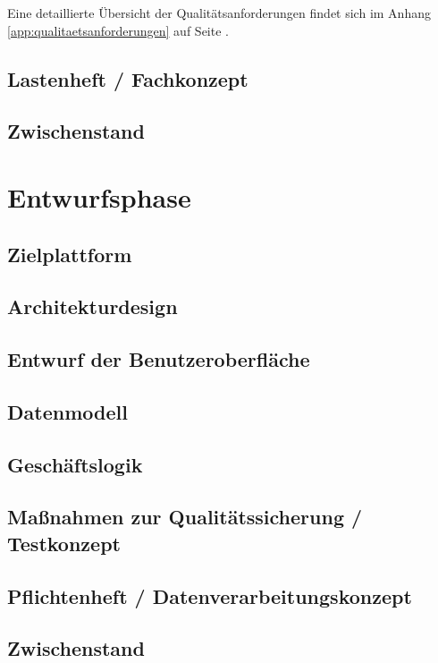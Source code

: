 \documentclass[12pt, xcolor=dvipsnames]{scrartcl}
\begin{document}
Eine detaillierte Übersicht der Qualitätsanforderungen findet sich im Anhang \ref{app:qualitaetsanforderungen} auf Seite \pageref{app:qualitaetsanforderungen}.


\subsection{Lastenheft / Fachkonzept}

\subsection{Zwischenstand}

\section{Entwurfsphase}

\subsection{Zielplattform}

\subsection{Architekturdesign}

\subsection{Entwurf der Benutzeroberfläche}

\subsection{Datenmodell}

\subsection{Geschäftslogik}

\subsection{Maßnahmen zur Qualitätssicherung / Testkonzept}

\subsection{Pflichtenheft / Datenverarbeitungskonzept}

\subsection{Zwischenstand}
\end{document}
